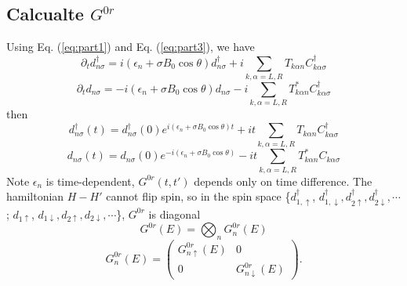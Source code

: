 \documentclass[11pt,a4paper]{article}
\begin{document}
\subsection{Calcualte $G^{0r}$}
Using Eq. (\ref{eq:part1}) and Eq. (\ref{eq:part3}), we have
\begin{equation}
\partial_{t}d_{n\sigma}^{\dag} =i(\epsilon_{n}+\sigma B_{0} \cos \theta) d_{n\sigma}^{\dag} + i\sum_{k, \alpha=L, R}T_{k \alpha n} C_{k \alpha \sigma}^{\dag}
\end{equation}
\begin{equation}
\partial_{t}d_{n\sigma} =-i(\epsilon_{n}+\sigma B_{0} \cos \theta) d_{n\sigma} - i\sum_{k, \alpha=L, R}T_{k \alpha n}^{*} C_{k \alpha \sigma}^{\dag}
\end{equation}
then
\begin{equation}
d_{n\sigma}^{\dag}(t) =d_{n\sigma}^{\dag}(0) e^{i(\epsilon_{n}+\sigma B_{0} \cos \theta)t}  + it\sum_{k, \alpha=L, R}T_{k \alpha n} C_{k \alpha \sigma}^{\dag}
\end{equation}
\begin{equation}
d_{n\sigma}(t) =d_{n\sigma}(0)e^{-i(\epsilon_{n}+\sigma B_{0} \cos \theta)} - it\sum_{k, \alpha=L, R}T_{k \alpha n}^{*} C_{k \alpha \sigma}
\end{equation}
Note $\epsilon_{n}$ is time-dependent, $G^{0r}(t,t')$ depends only on time difference. 
The hamiltonian $H-H'$ cannot flip spin, so in the spin space \{$d_{1,\uparrow}^{\dag}$, $d_{1,\downarrow}^{\dag}, d_{2\uparrow}^{\dag}, d_{2\downarrow}^{\dag}, \cdots$; $d_{1\uparrow}$, $d_{1\downarrow}, d_{2\uparrow}, d_{2\downarrow}, \cdots$\}, $G^{0r}$ is diagonal
\begin{equation}
G^{0r}(E)=\bigotimes_{n}G_{n}^{0r}(E)
\end{equation}
\begin{equation}
G_{n}^{0r}(E) = \left(\begin{array}{cc}
G_{n\uparrow}^{0r}(E) &0 \\
0 & G_{n\downarrow}^{0r}(E)
\end{array}\right).
\end{equation}
\end{document}
